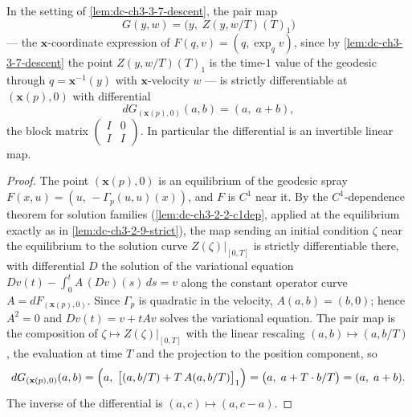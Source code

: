 \begin{lemma}
  \label{lem:dc-ch3-3-7-pairmap}
  \leanok
  In the setting of \cref{lem:dc-ch3-3-7-descent}, the pair map
  $$
  G(y,w)=\bigl(y,\;Z(y,w/T)(T)_1\bigr)
  $$
  — the $\mathbf{x}$-coordinate expression of $F(q,v)=(q,\exp_q v)$, since by
  \cref{lem:dc-ch3-3-7-descent} the point $Z(y,w/T)(T)_1$ is the time-$1$ value
  of the geodesic through $q=\mathbf{x}^{-1}(y)$ with $\mathbf{x}$-velocity $w$ —
  is strictly differentiable at $(\mathbf{x}(p),0)$ with differential
  $$
  dG_{(\mathbf{x}(p),0)}(a,b)=(a,\;a+b),
  $$
  the block matrix $\begin{pmatrix}I & 0\\ I & I\end{pmatrix}$. In
  particular the differential is an invertible linear map.
\end{lemma}
\begin{proof}
  \sketch
  \leanok
  The point $(\mathbf{x}(p),0)$ is an equilibrium of the geodesic spray
  $F(x,u)=(u,\,-\Gamma_p(u,u)(x))$, and $F$ is $C^1$ near it. By the
  $C^1$-dependence theorem for solution families
  (\cref{lem:dc-ch3-2-2-c1dep}, applied at the equilibrium exactly as in
  \cref{lem:dc-ch3-2-9-strict}), the map sending an initial condition $\zeta$
  near the equilibrium to the solution curve $Z(\zeta)|_{[0,T]}$ is strictly
  differentiable there, with differential $D$ the solution of the variational
  equation $Dv(t)-\int_0^t A\,(Dv)(s)\,ds=v$ along the constant operator curve
  $A=dF_{(\mathbf{x}(p),0)}$. Since $\Gamma_p$ is quadratic in the velocity,
  $A(a,b)=(b,0)$; hence $A^2=0$ and $Dv(t)=v+tAv$ solves the variational
  equation. The pair map is the composition of $\zeta\mapsto Z(\zeta)|_{[0,T]}$
  with the linear rescaling $(a,b)\mapsto(a,b/T)$, the evaluation at time $T$
  and the projection to the position component, so
  $$
  dG_{(\mathbf{x}(p),0)}(a,b)
    =\Bigl(a,\;\bigl[(a,b/T)+T\,A(a,b/T)\bigr]_1\Bigr)
    =\bigl(a,\;a+T\cdot b/T\bigr)=(a,\;a+b).
  $$
  The inverse of the differential is $(a,c)\mapsto(a,c-a)$.
\end{proof}

